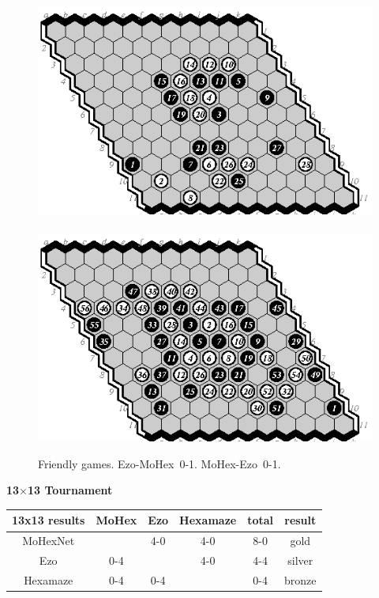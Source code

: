 \documentclass{icga}
\def\Eo{\mbox{\sc Ezo}}
\def\Hz{\mbox{\sc Hexamaze}}
\def\Mx{\mbox{\sc MoHex}}
\def\Mt{\mbox{\sc MoHexNet}}
\begin{document}
\begin{figure}[hbp]
\includegraphics[scale=1.3]{games/pix/em-friendly-0-1.eps}\hspace*{-1cm}\
\includegraphics[scale=1.3]{games/pix/me-friendly-0-1.eps}
\caption{Friendly games. \Eo-\Mx\ 0-1. \Mx-\Eo\ 0-1.}
\end{figure}

\newpage
{\large\bf 13$\times$13 Tournament}

\hfill\begin{tabular}{|c|c|c|c|c|c|}
\hline 13x13 results &\Mx{} &\Eo{}  &\Hz{} & total & result \\ 
\hline \Mt{}         &      &  4-0  & 4-0  & 8-0   & gold \\
\hline \Eo{}         &  0-4 &       & 4-0  & 4-4   & silver \\
\hline \Hz{}         &  0-4 &  0-4  &      & 0-4   & bronze \\
\hline
\end{tabular}\hfill~
\end{document}
